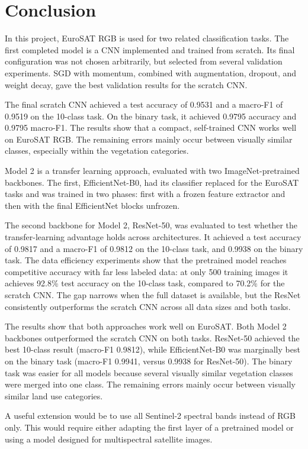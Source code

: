 \section{Conclusion}

In this project, EuroSAT RGB is used for two related classification tasks. The
first completed model is a CNN implemented and trained from scratch. Its final
configuration was not chosen arbitrarily, but selected from several validation
experiments. SGD with momentum, combined with augmentation, dropout, and weight
decay, gave the best validation results for the scratch CNN.

The final scratch CNN achieved a test accuracy of 0.9531 and a macro-F1 of
0.9519 on the 10-class task. On the binary task, it achieved 0.9795 accuracy and
0.9795 macro-F1. The results show that a compact, self-trained CNN works well on
EuroSAT RGB. The remaining errors mainly occur between visually similar classes,
especially within the vegetation categories.

Model 2 is a transfer learning approach, evaluated with two ImageNet-pretrained
backbones. The first, EfficientNet-B0, had its classifier replaced for the
EuroSAT tasks and was trained in two phases: first with a frozen feature
extractor and then with the final EfficientNet blocks unfrozen.

The second backbone for Model 2, ResNet-50, was evaluated to test whether the
transfer-learning advantage holds across architectures. It achieved a test
accuracy of 0.9817 and a macro-F1 of 0.9812 on the
10-class task, and 0.9938 on the binary task. The data efficiency experiments
show that the pretrained model reaches competitive accuracy with far less
labeled data: at only 500 training images it achieves 92.8\% test accuracy on
the 10-class task, compared to 70.2\% for the scratch CNN. The gap narrows when
the full dataset is available, but the ResNet consistently outperforms the
scratch CNN across all data sizes and both tasks.

The results show that both approaches work well on EuroSAT. Both Model 2 backbones
outperformed the scratch CNN on both tasks. ResNet-50 achieved the best 10-class
result (macro-F1 0.9812), while EfficientNet-B0 was marginally best on the binary
task (macro-F1 0.9941, versus 0.9938 for ResNet-50). The binary task was easier
for all models because
several visually similar
vegetation classes were merged into one class. The remaining errors mainly occur
between visually similar land use categories.

A useful extension would be to use all Sentinel-2 spectral bands instead of RGB
only. This would require either adapting the first layer of a pretrained model
or using a model designed for multispectral satellite images.